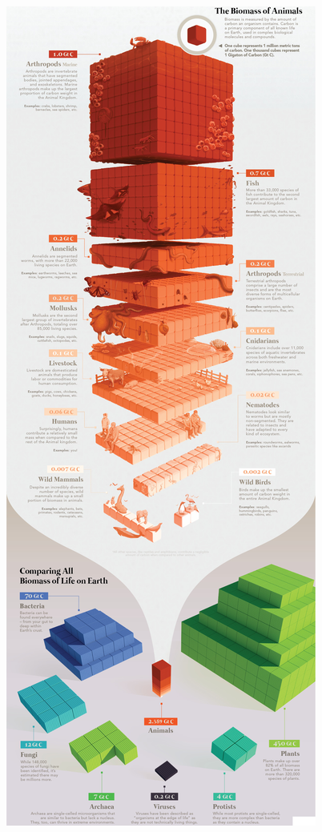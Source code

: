 \teteSndAP
\vspace*{-36pt}

\begin{multicols}{2}

\vspace*{-24pt}
\hspace*{-12pt}
\includegraphics[height=1.02\textheight]{accompagnement_personnel/biomass_earth.jpg}


\end{multicols}
